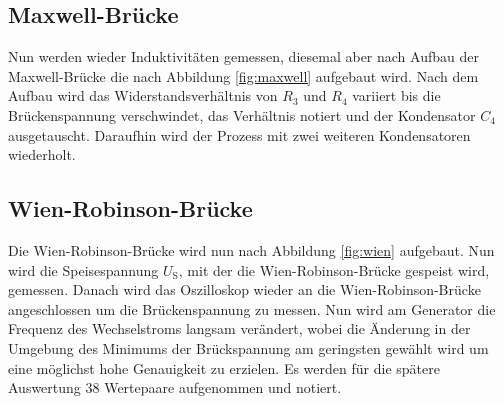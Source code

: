 \subsection{Maxwell-Brücke}

Nun werden wieder Induktivitäten gemessen, diesemal aber nach Aufbau der Maxwell-Brücke die nach Abbildung \ref{fig:maxwell} aufgebaut wird.
Nach dem Aufbau wird das Widerstandsverhältnis von $R_3$ und $R_4$ variiert bis die Brückenspannung verschwindet, das Verhältnis notiert und der Kondensator $C_4$ ausgetauscht.
Daraufhin wird der Prozess mit zwei weiteren Kondensatoren wiederholt.

\subsection{Wien-Robinson-Brücke}

Die Wien-Robinson-Brücke wird nun nach Abbildung \ref{fig:wien} aufgebaut. 
Nun wird die Speisespannung $U_\text{S}$, mit der die Wien-Robinson-Brücke gespeist wird, gemessen.
Danach wird das Oszilloskop wieder an die Wien-Robinson-Brücke angeschlossen um die Brückenspannung zu messen.
Nun wird am Generator die Frequenz des Wechselstroms langsam verändert, wobei die Änderung in der Umgebung des Minimums der Brückspannung am geringsten gewählt wird um eine möglichst hohe Genauigkeit zu erzielen. 
Es werden für die spätere Auswertung 38 Wertepaare aufgenommen und notiert.



 
